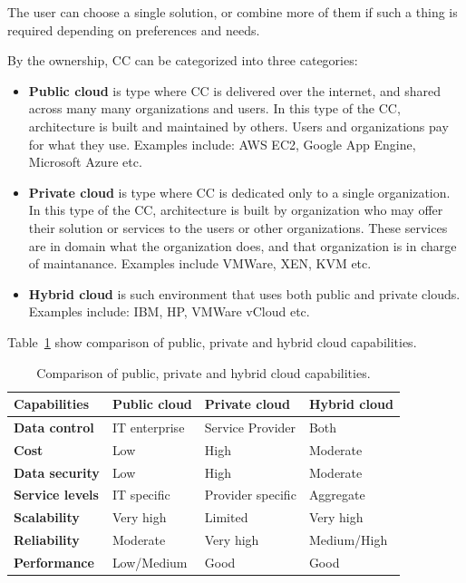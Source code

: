 The user can choose a single solution, or combine more of them if such a thing is required depending on preferences and needs.

By the ownership, CC can be categorized into three categories:

\begin{itemize}
	\item \textbf{Public cloud} is type where CC is delivered over the internet, and shared across many many organizations and users. In this type of the CC, architecture is built and maintained by others. Users and organizations pay for what they use. Examples include: AWS EC2, Google App Engine, Microsoft Azure etc.
	\item \textbf{Private cloud} is type where CC is dedicated only to a single organization. In this type of the CC, architecture is built by organization who may offer their solution or services to the users or other organizations. These services are in domain what the organization does, and that organization is in charge of maintanance. Examples include VMWare, XEN, KVM etc.
	\item \textbf{Hybrid cloud} is such environment that uses both public and private clouds. Examples include: IBM, HP, VMWare vCloud etc.
\end{itemize}

Table~\ref{tab:table4} show comparison of public, private and hybrid cloud capabilities.

\begin{table}[h!]
	\begin{center}
		\begin{tabular}{l|l|l|l}
			\textbf{Capabilities} & \textbf{Public cloud} & \textbf{Private cloud} & \textbf{Hybrid cloud}\\
			\hline
			\textbf{Data control} & IT enterprise & Service Provider & Both \\
			\textbf{Cost} & Low & High & Moderate \\
			\textbf{Data security} & Low & High & Moderate \\
			\textbf{Service levels} & IT specific & Provider specific & Aggregate \\
			\textbf{Scalability} & Very high & Limited & Very high \\	
			\textbf{Reliability} & Moderate & Very high & Medium/High\\	
			\textbf{Performance} & Low/Medium & Good & Good \\
\end{tabular}
	\end{center}
	\vspace{-0.5cm}
	\caption{Comparison of public, private and hybrid cloud capabilities.}
	\label{tab:table4}
\end{table}

